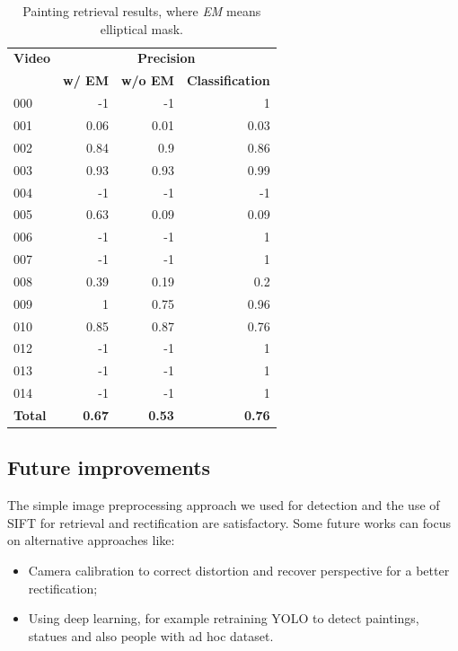 \documentclass[10pt,twocolumn,letterpaper]{article}
\begin{document}
\begin{table}[]
\begin{center}
\begin{tabular}{lrrr}
\multicolumn{1}{c}{\textbf{Video}} & \multicolumn{3}{c}{\textbf{Precision}} \\
\multicolumn{1}{c}{} & \multicolumn{1}{c}{\textbf{w/ EM}} & \multicolumn{1}{c}{\textbf{w/o EM}} & \multicolumn{1}{c}{\textbf{Classification}} \\ \hline \hline
000 & -1 & -1 & 1 \\
001 & 0.06 & 0.01 & 0.03 \\
002 & 0.84 & 0.9 & 0.86 \\
003 & 0.93 & 0.93 & 0.99 \\
004 & -1 & -1 & -1 \\
005 & 0.63 & 0.09 & 0.09 \\
006 & -1 & -1 & 1 \\
007 & -1 & -1 & 1 \\
008 & 0.39 & 0.19 & 0.2 \\
009 & 1 & 0.75 & 0.96 \\
010 & 0.85 & 0.87 & 0.76 \\
012 & -1 & -1 & 1 \\
013 & -1 & -1 & 1 \\
014 & -1 & -1 & 1 \\ \hline \hline
\textbf{Total} & \textbf{0.67} & \textbf{0.53} & \textbf{0.76}
\end{tabular}
\end{center}
\caption{Painting retrieval results, where \textit{EM} means elliptical mask.}
\label{tab:PaintingRetrievalResults}
\end{table}

\subsection{Future improvements}
\label{subsec:FutureImprovements}
The simple image preprocessing approach we used for detection and the use of SIFT for retrieval and rectification are satisfactory. Some future works can focus on alternative approaches like:
\begin{itemize}
    \item Camera calibration to correct distortion and recover perspective for a better rectification;
    \item Using deep learning, for example retraining YOLO to detect paintings, statues and also people with ad hoc dataset.
\end{itemize}

{\small


}
\end{document}
